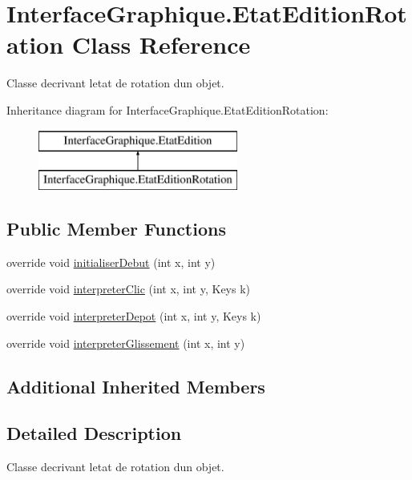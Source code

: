 \hypertarget{class_interface_graphique_1_1_etat_edition_rotation}{}\section{Interface\+Graphique.\+Etat\+Edition\+Rotation Class Reference}
\label{class_interface_graphique_1_1_etat_edition_rotation}


Classe decrivant l\textquotesingle{}etat de rotation d\textquotesingle{}un objet.  


Inheritance diagram for Interface\+Graphique.\+Etat\+Edition\+Rotation\+:\begin{figure}[H]
\begin{center}
\leavevmode
\includegraphics[height=2.000000cm]{class_interface_graphique_1_1_etat_edition_rotation}
\end{center}
\end{figure}
\subsection*{Public Member Functions}
\begin{DoxyCompactItemize}
\item 
override void \hyperlink{group__inf2990_ga6a6051304cdd5153ff8068c24ef1b6a8}{initialiser\+Debut} (int x, int y)
\item 
override void \hyperlink{group__inf2990_gad8114645cabee8c5134dbb26ec1e9705}{interpreter\+Clic} (int x, int y, Keys k)
\item 
override void \hyperlink{group__inf2990_gac99c3de472604def3a32384c864a5d63}{interpreter\+Depot} (int x, int y, Keys k)
\item 
override void \hyperlink{group__inf2990_gace97575f8172e5d90b07a1700e42211d}{interpreter\+Glissement} (int x, int y)
\end{DoxyCompactItemize}
\subsection*{Additional Inherited Members}


\subsection{Detailed Description}
Classe decrivant l\textquotesingle{}etat de rotation d\textquotesingle{}un objet. 


